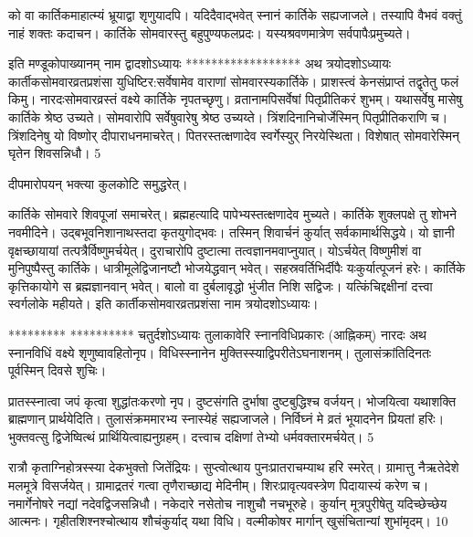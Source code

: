 को वा कार्तिकमाहात्म्यं भ्रूयाद्वा शृणुयादपि।
यदिदैवाद्भवेत् स्नानं कार्तिके सह्यजाजले।
तस्यापि वैभवं वक्तुं नाहं शक्तः कदाचन।
कार्तिके सोमवारस्तु बहुपुण्यफलप्रदः।
यस्यश्रवणमात्रेण सर्वपापैःप्रमुच्यते।

इति मण्डूकोपाख्यानम् नाम द्वादशोऽध्यायः
******************
अथ त्रयोदशोऽध्यायः
कार्तीकसोमवारव्रतप्रशंसा युधिष्टिर:सर्वेषामेव वाराणां सोमवारस्यकार्तिके।
प्राशस्त्वं केनसंप्राप्तं तद्वृतेतु फलं किमु।
नारदःसोमवारव्रस्तं वक्ष्ये कार्तिके नृपतच्छृणु।
व्रतानामपिसर्वेषां पितृप्रीतिकरं शुभम्।
यथासर्वेषु मासेषु कार्तिके श्रेष्ठ उच्यते।
सोमवारोपि सर्वेषुवारेषु श्रेष्ठ उच्यय्ते।
त्रिंशदिनानिचोर्जेस्मिन् पितृप्रीतिकराणि च।
त्रिंशदिनेषु यो विष्णोर् दीपाराधनमाचरेत्।
पितरस्तत्क्षणादेव स्वर्गेस्युर् निरयेस्थिता।
विशेषात् सोमवारेस्मिन् घृतेन शिवसन्निधौ।
5

दीपमारोपयन् भक्त्या कुलकोटि समुद्धरेत्।

कार्तिके सोमवारे शिवपूजां समाचरेत्।
ब्रह्महत्यादि पापेभ्यस्तत्क्षणादेव मुच्यते।
कार्तिके शुक्लपक्षे तु शोभने नवमीदिने।
उद्बभूवनिशानाथस्तदा कृतयुगोद्भवः।
तस्मिन् शिवार्चनं कुर्यात् सर्वकामार्थसिद्धये।
यो ज्ञानी वृक्षच्छायायां तत्पत्रैर्विष्णुमर्चयेत्।
दुराचारोपि दुष्टात्मा तत्वज्ञानमवाप्नुयात्।
योऽर्चयेत् विष्णुमीशं वा मुनिपुष्पैस्तु कार्तिके।
धात्रीमूलेद्विजानष्टौ भोजयेद्धवान् भवेत्।
सहस्रवर्तिभिर्दीपैः यःकुर्यात्पूजनं हरेः।
कार्तिके कृत्तिकायोगे स ब्रह्मज्ञानवान् भवेत्।
बालो वा दुर्बलावृद्धो भुंजीत निशि सद्विजः।
यत्किंचिद्दक्षीनां दत्त्वा स्वर्गलोके महीयते।
इति कार्तीकसोमवारव्रतप्रशंसा नाम
त्रयोदशोऽध्यायः।

*********
**********
चतुर्दशोऽध्यायः तुलाकावेरि स्नानविधिप्रकारः (आह्निकम्)
नारदः
अथ स्नानविधिं वक्ष्ये शृणुष्वावहितोनृप।
विधिस्स्नानेन मुक्तिस्स्याद्विपरीतेऽघनाशनम्।
तुलासंक्रांतिदिनतः पूर्वस्मिन् दिवसे शुचिः।

प्रातस्स्नात्वा जपं कृत्वा शुद्धांतःकरणो नृप।
दुष्टसंगति दुर्भाषा दुष्टबुद्धिश्च वर्जयन्।
भोजयित्वा यथाशक्ति ब्राह्मणान् प्रार्थयेदिति।
तुलासंक्रममारभ्य स्नास्येहं सह्यजाजले।
निर्विघ्नं मे व्रतं भूयादनेन प्रियतां हरिः।
भुक्तवत्सु द्विजेष्वित्थं प्रार्थियित्वाह्यनुग्रहम्।
दत्त्वाच दक्षिणां तेभ्यो धर्मवक्तारमर्चयेत्।
5

रात्रौ कृताग्निहोत्रस्स्या देकभुक्तो जितेंद्रियः।
सुप्त्वोत्थाय पुनःप्रातराचम्याथ हरि स्मरेत्।
ग्रामात्तु नैऋतेदेशे मलमूत्रे विसर्जयेत्।
ग्रामाद्रतरं गत्वा तृणैराच्छाद्य मेदिनीम्।
शिरःप्रावृत्यवस्त्रेण पिदायास्यं करेण च।
नमार्गेनोषरे नद्यां नदेवद्विजसन्निधौ।
नकेदारे नसेतोच नाशुचौ नचभूरुहे।
कुर्यान् मूत्रपुरीषेतु यदिच्छेच्छेय आत्मनः।
गृहीतशिश्नश्चोत्थाय शौचंकुर्याद् यथा विधि।
वल्मीकोषर मार्गान् खुसंचितान्यां शुभांमृदम्।
10

